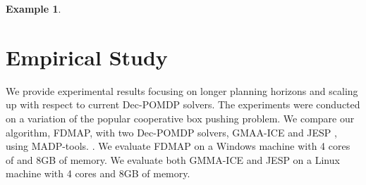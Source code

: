 \documentclass[letterpaper]{article} %
\theoremstyle{definition}
\newtheorem{example}{Example}
\newcommand{\commentout}[1]{}
\begin{document}
{\begin{example}
\end{example}
}

\commentout{
\begin{algorithm}
\caption{Alignment Iteration}
\begin{algorithmic}[tbph]
\State Input: PolicyGraphs $G_1, ..., G_M$
\For{$G_i,  i\in\{1, ..., M\}$}
	\State {$\mathit{NoopsReqs} \gets \mathit{VertexToIntMapping}$}
      \State {$\mathit{CurrBFS} \gets \Call{BFS}{G_i}$}
      \While {$\mathit{CurrBFS.queue}$ is not empty}
	\State {$v \gets \mathit{CurrBFS.queue.pop}$}
	\State {$a \gets v.action$}
	\If {$a$ is public action}
	\State {$\mathit{identifier} \gets \Call{GetIdentifier}{v}$}
	\State {$\mathit{MaxNoop} \gets 0$}
	\For {$G_j,  j\in\{1, ..., M\}\setminus\{i\}$}
	\State {$\mathit{CurrNoop} \gets \Call{NoopReq}{G_j, \mathit{identifier}}$}
	\State {$\mathit{MaxNoop} \gets max(\mathit{MaxNoop}, \mathit{CurrNoop})$}
	\EndFor
	\State {$\mathit{NoopsReqs}[v] \gets \mathit{MaxNoop} - \mathit{CompensationTerm}$}
	\EndIf
	\EndWhile
	\State {$G_i' \gets \Call{AddNoops}{G_i, \mathit{NoopsReqs}}$}
\EndFor
\State {return $G_1', ..., G_M'$}
\end{algorithmic}
\end{algorithm}
}

\section{Empirical Study}

We provide experimental results focusing on longer planning horizons and scaling up with respect to current Dec-POMDP solvers.
The experiments were conducted on a variation of the popular cooperative box pushing problem.
We compare our algorithm, FDMAP, with two Dec-POMDP solvers, GMAA-ICE \cite{GMAAICE} and JESP \cite{JESP}, using MADP-tools. \cite{MADP}.
We evaluate FDMAP on a Windows machine with 4 cores of and 8GB of memory. We evaluate both GMMA-ICE and JESP on a Linux machine with 4 cores and 8GB of memory.
\end{document}
